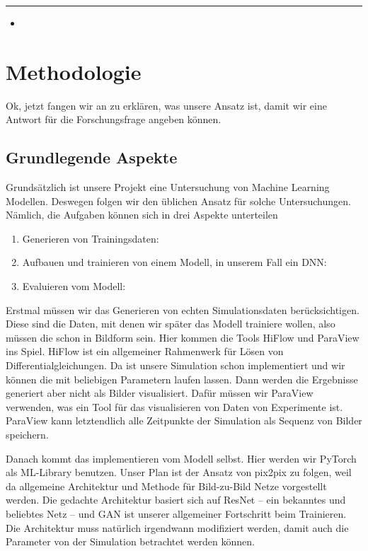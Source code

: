 \documentclass[margin=0.05in, tmargin=0.01in]{article}
\begin{document}
\noindent\rule{\textwidth}{0.5pt}
\begin{itemize}
\item 
\end{itemize}

\section{Methodologie}
\label{sec:org349e811}
Ok, jetzt fangen wir an zu erklären, was unsere Ansatz ist, damit wir eine Antwort für die Forschungsfrage angeben können.

\subsection{Grundlegende Aspekte}
\label{sec:org5f1dcb5}
Grundsätzlich ist unsere Projekt eine Untersuchung von Machine Learning Modellen. Deswegen folgen wir den üblichen Ansatz für solche Untersuchungen. Nämlich, die Aufgaben können sich in drei Aspekte unterteilen
\begin{enumerate}
\item Generieren von Trainingsdaten:
\item Aufbauen und trainieren von einem Modell, in unserem Fall ein DNN:
\item Evaluieren vom Modell:
\end{enumerate}

Erstmal müssen wir das Generieren von echten Simulationsdaten berücksichtigen. Diese sind die Daten, mit denen wir später das Modell trainiere wollen, also müssen die schon in Bildform sein. Hier kommen die Tools HiFlow und ParaView ins Spiel. HiFlow ist ein allgemeiner Rahmenwerk für Lösen von Differentialgleichungen. Da ist unsere Simulation schon implementiert und wir können die mit beliebigen Parametern laufen lassen. Dann werden die Ergebnisse generiert aber nicht als Bilder visualisiert. Dafür müssen wir ParaView verwenden, was ein Tool für das visualisieren von Daten von Experimente ist. ParaView kann letztendlich alle Zeitpunkte der Simulation als Sequenz von Bilder speichern.



Danach kommt das implementieren vom Modell selbst. Hier werden wir PyTorch als ML-Library benutzen. Unser Plan ist der Ansatz von pix2pix zu folgen, weil da allgemeine Architektur und Methode für Bild-zu-Bild Netze vorgestellt werden. Die gedachte Architektur basiert sich auf ResNet -- ein bekanntes und beliebtes Netz -- und GAN ist unserer allgemeiner Fortschritt beim Trainieren. Die Architektur muss natürlich irgendwann modifiziert werden, damit auch die Parameter von der Simulation betrachtet werden können.
\end{document}
